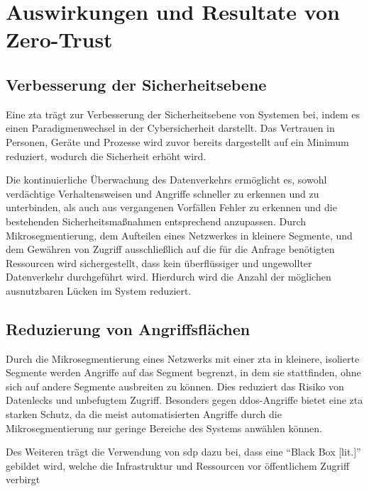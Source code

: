\newpage


\section{Auswirkungen und Resultate von Zero-Trust}\label{sec:auswirkungen-und-resultate-von-zero-trust}

\subsection{Verbesserung der Sicherheitsebene}\label{subsec:verbesserung-der-sicherheitsebene}
Eine \ac{zta} trägt zur Verbesserung der Sicherheitsebene von Systemen bei, indem es einen Paradigmenwechsel in der Cybersicherheit darstellt.
Das Vertrauen in Personen, Geräte und Prozesse wird zuvor bereits dargestellt auf ein Minimum reduziert, wodurch die Sicherheit erhöht wird.

Die kontinuierliche Überwachung des Datenverkehrs ermöglicht es, sowohl verdächtige Verhaltensweisen und Angriffe schneller zu erkennen und zu unterbinden, als auch aus vergangenen Vorfällen Fehler zu erkennen und die bestehenden Sicherheitsmaßnahmen entsprechend anzupassen.\autocite[\vglf][]{buck-2021}
Durch Mikrosegmentierung, dem Aufteilen eines Netzwerkes in kleinere Segmente, und dem Gewähren von Zugriff ausschließlich auf die für die Anfrage benötigten Ressourcen wird sichergestellt, dass kein überflüssiger und ungewollter Datenverkehr durchgeführt wird.\autocite[\vglf][]{shore-2021}
Hierdurch wird die Anzahl der möglichen ausnutzbaren Lücken im System reduziert.


\subsection{Reduzierung von Angriffsflächen}\label{subsec:reduzierung-von-angriffsflachen}
Durch die Mikrosegmentierung eines Netzwerks mit einer \ac{zta} in kleinere, isolierte Segmente werden Angriffe auf das Segment begrenzt, in dem sie stattfinden, ohne sich auf andere Segmente ausbreiten zu können.
Dies reduziert das Risiko von Datenlecks und unbefugtem Zugriff.\autocites[\vglf][]{shore-2021}[\vglf][]{buck-2021}
Besonders gegen \ac{ddos}-Angriffe bietet eine \ac{zta} starken Schutz, da die meist automatisierten Angriffe durch die Mikrosegmentierung nur geringe Bereiche des Systems anwählen können.\autocite[\vglf][]{Eidle-2017}

Des Weiteren trägt die Verwendung von \ac{sdp} dazu bei, dass eine \enquote{Black Box [lit.]} gebildet wird, welche die Infrastruktur und Ressourcen vor öffentlichem Zugriff verbirgt\autocites[\vglf][]{buck-2021}[\vglf][]{kumar-2019}

